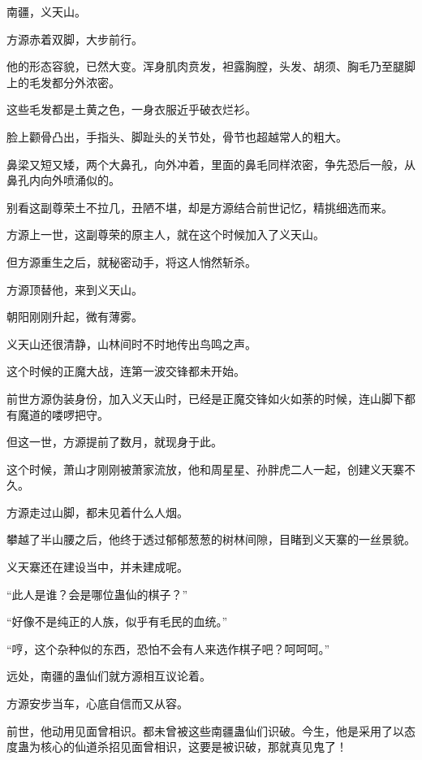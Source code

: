 
\begin{this_body}



南疆，义天山。

方源赤着双脚，大步前行。

他的形态容貌，已然大变。浑身肌肉贲发，袒露胸膛，头发、胡须、胸毛乃至腿脚上的毛发都分外浓密。

这些毛发都是土黄之色，一身衣服近乎破衣烂衫。

脸上颧骨凸出，手指头、脚趾头的关节处，骨节也超越常人的粗大。

鼻梁又短又矮，两个大鼻孔，向外冲着，里面的鼻毛同样浓密，争先恐后一般，从鼻孔内向外喷涌似的。

别看这副尊荣土不拉几，丑陋不堪，却是方源结合前世记忆，精挑细选而来。

方源上一世，这副尊荣的原主人，就在这个时候加入了义天山。

但方源重生之后，就秘密动手，将这人悄然斩杀。

方源顶替他，来到义天山。

朝阳刚刚升起，微有薄雾。

义天山还很清静，山林间时不时地传出鸟鸣之声。

这个时候的正魔大战，连第一波交锋都未开始。

前世方源伪装身份，加入义天山时，已经是正魔交锋如火如荼的时候，连山脚下都有魔道的喽啰把守。

但这一世，方源提前了数月，就现身于此。

这个时候，萧山才刚刚被萧家流放，他和周星星、孙胖虎二人一起，创建义天寨不久。

方源走过山脚，都未见着什么人烟。

攀越了半山腰之后，他终于透过郁郁葱葱的树林间隙，目睹到义天寨的一丝景貌。

义天寨还在建设当中，并未建成呢。

“此人是谁？会是哪位蛊仙的棋子？”

“好像不是纯正的人族，似乎有毛民的血统。”

“哼，这个杂种似的东西，恐怕不会有人来选作棋子吧？呵呵呵。”

远处，南疆的蛊仙们就方源相互议论着。

方源安步当车，心底自信而又从容。

前世，他动用见面曾相识。都未曾被这些南疆蛊仙们识破。今生，他是采用了以态度蛊为核心的仙道杀招见面曾相识，这要是被识破，那就真见鬼了！


\end{this_body}
